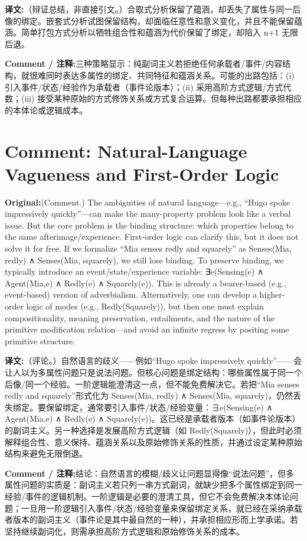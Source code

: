 \documentclass[11pt,a4paper]{article}
\newcommand{\eng}[1]{\begin{engbox}\noindent\textbf{Original:}\quad #1\end{engbox}}
\newcommand{\cn}[1]{\begin{cnbox}\noindent\textbf{译文:}\quad #1\end{cnbox}}
\newcommand{\cmt}[1]{\begin{commentbox}\noindent\textbf{Comment / 注释:}\quad #1\end{commentbox}}
\begin{document}
\cn{（辩证总结，非直接引文。）合取式分析保留了蕴涵，却丢失了属性与同一后像的绑定。嵌套式分析试图保留结构，却面临任意性和意义变化，并且不能保留蕴涵。简单打包方式分析以牺牲组合性和蕴涵为代价保留了绑定，却陷入 n+1 无限后退。}

\cmt{三种策略显示：纯副词主义若拒绝任何承载者/事件/内容结构，就很难同时表达多属性的绑定、共同特征和蕴涵关系。可能的出路包括：(i) 引入事件/状态/经验作为承载者（事件论版本）；(ii) 采用高阶方式逻辑/方式代数；(iii) 接受某种原始的方式修饰关系或方式复合运算。但每种出路都要承担相应的本体论或逻辑成本。}

\section{Comment: Natural-Language Vagueness and First-Order Logic}

\eng{(Comment.) The ambiguities of natural language—e.g., “Hugo spoke impressively quickly”—can make the many-property problem look like a verbal issue. But the core problem is the binding structure: which properties belong to the same afterimage/experience. First-order logic can clarify this, but it does not solve it for free. If we formalize “Mia senses redly and squarely” as Senses(Mia, redly) ∧ Senses(Mia, squarely), we still lose binding. To preserve binding, we typically introduce an event/state/experience variable: ∃e(Sensing(e) ∧ Agent(Mia,e) ∧ Redly(e) ∧ Squarely(e)). This is already a bearer-based (e.g., event-based) version of adverbialism. Alternatively, one can develop a higher-order logic of modes (e.g., Redly(Squarely)), but then one must explain compositionality, meaning preservation, entailments, and the nature of the primitive modification relation—and avoid an infinite regress by positing some primitive structure.}

\cn{（评论。）自然语言的歧义——例如“Hugo spoke impressively quickly”——会让人以为多属性问题只是说法问题。但核心问题是绑定结构：哪些属性属于同一个后像/同一个经验。一阶逻辑能澄清这一点，但不能免费解决它。若把“Mia senses redly and squarely”形式化为 Senses(Mia, redly) ∧ Senses(Mia, squarely)，仍然丢失绑定。要保留绑定，通常要引入事件/状态/经验变量：∃e(Sensing(e) ∧ Agent(Mia,e) ∧ Redly(e) ∧ Squarely(e))。这已经是承载者版本（如事件论版本）的副词主义。另一种选择是发展高阶方式逻辑（如 Redly(Squarely)），但此时必须解释组合性、意义保持、蕴涵关系以及原始修饰关系的性质，并通过设定某种原始结构来避免无限倒退。}

\cmt{结论：自然语言的模糊/歧义让问题显得像“说法问题”，但多属性问题的实质是：副词主义若只列一串方式副词，就缺少把多个属性绑定到同一经验/事件的逻辑机制。一阶逻辑是必要的澄清工具，但它不会免费解决本体论问题；一旦用一阶逻辑引入事件/状态/经验变量来保留绑定关系，就已经在采纳承载者版本的副词主义（事件论是其中最自然的一种），并承担相应形而上学承诺。若坚持继续副词化，则需承担高阶方式逻辑和原始修饰关系的成本。}
\end{document}
